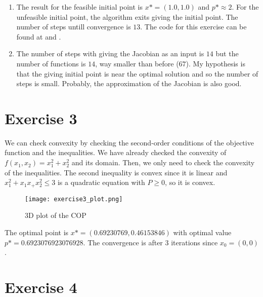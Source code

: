\documentclass[12pt, a4paper]{article}
\begin{document}
\begin{enumerate}[label={(\alph*)}, ref=\arabic*, leftmargin=0cm]
\newpage

  \item The result for the feasible initial point is $x* = (1.0, 1.0)$ and $p* \approx 2$. For the unfeasible initial point, the algorithm exits giving the initial point. The number of steps untill convergence is $13$. The code for this exercise can be found at  and .

  \item The number of steps with giving the Jacobian as an input is $14$ but the number of functions is $14$, way smaller than before ($67$). My hypothesis is that the giving initial point is near the optimal solution and so the number of steps is small. Probably, the approximation of the Jacobian is also good.

\end{enumerate}


\newpage
\section*{Exercise 3}%
\label{sec:exercise_3}

We can check convexity by checking the second-order conditions of the objective function and the inequalities. We have already checked the convexity of $f(x_1,x_2) = x_1^2+x_2^2$ and its domain. Then, we only need to check the convexity of the inequalities. The second inequality is convex since it is linear and $x_1^2 + x_1x_ + x_2^2 \leq 3$ is a quadratic equation with $P \geq 0$, so it is convex.

\begin{figure}[H]
  \centering
  \texttt{[image: exercise3\_plot.png]}
  \label{fig:exercise3}
  \caption{3D plot of the COP}
\end{figure}

The optimal point is $x* = (0.69230769, 0.46153846)$ with optimal value $p* = 0.6923076923076928$. The convergence is after 3 iterations since $x_0 = (0, 0)$.


\newpage
\section*{Exercise 4}%
\label{sec:exercise_4}

\begin{listing}[H]
  \inputminted[breaklines=true,fontsize=\footnotesize]{python}{../exercise4.py}
  \label{lst:exercise4}
  \caption{}
\end{listing}
\end{document}

